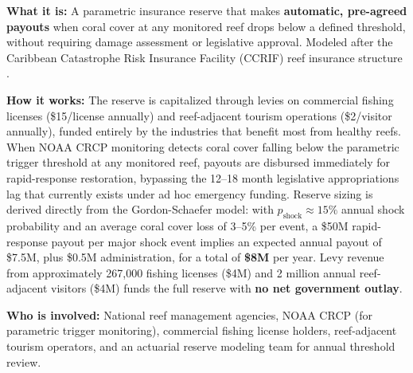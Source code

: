 \documentclass[10pt,letterpaper]{article}
\newcounter{metric}
\begin{document}
\medskip

\begin{tcolorbox}[title=Program 4: National Reef Insurance Reserve --- \$8M Annual Total,
  colback=red!5, colframe=red!50!black, fonttitle=\bfseries, breakable]

  \textbf{What it is:} A parametric insurance reserve that makes \textbf{automatic, pre-agreed
  payouts} when coral cover at any monitored reef drops below a defined threshold, without
  requiring damage assessment or legislative approval. Modeled after the Caribbean Catastrophe
  Risk Insurance Facility (CCRIF) reef insurance structure \cite{ccrif_reef_insurance}.

  \medskip
  \textbf{How it works:} The reserve is capitalized through levies on commercial fishing
  licenses (\$15/license annually) and reef-adjacent tourism operations (\$2/visitor annually),
  funded entirely by the industries that benefit most from healthy reefs. When NOAA CRCP
  monitoring detects coral cover falling below the parametric trigger threshold at any monitored
  reef, payouts are disbursed immediately for rapid-response restoration, bypassing the
  12--18 month legislative appropriations lag that currently exists under ad hoc emergency
  funding. Reserve sizing is derived directly from the Gordon-Schaefer model: with
  $p_{\text{shock}} \approx 15\%$ annual shock probability and an average coral cover loss of
  3--5\% per event, a \$50M rapid-response payout per major shock event implies an expected
  annual payout of \$7.5M, plus \$0.5M administration, for a total of \textbf{\$8M} per year.
  Levy revenue from approximately 267,000 fishing licenses (\$4M) and 2 million annual
  reef-adjacent visitors (\$4M) funds the full reserve with \textbf{no net government outlay}.

  \medskip
  \textbf{Who is involved:} National reef management agencies, NOAA CRCP (for parametric
  trigger monitoring), commercial fishing license holders, reef-adjacent tourism operators, and
  an actuarial reserve modeling team for annual threshold review.


\end{tcolorbox}
\end{document}
